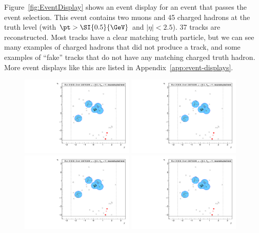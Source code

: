 Figure~\ref{fig:EventDisplay} shows an event display for an event that passes the event selection. This event contains two muons and 45 charged hadrons at the truth level (with $\pt>\SI{0.5}{\GeV}$ and $|\eta|<2.5$). 37 tracks are reconstructed. Most tracks have a clear matching truth particle, but we can see many examples of charged hadrons that did not produce a track, and some examples of ``fake'' tracks that do not have any matching charged truth hadron. More event displays like this are listed in Appendix~\ref{app:event-displays}.

\begin{figure}[h!]
  \centering
  \includegraphics[page=26,width=0.48\textwidth]{figures/EventDisplays.pdf}
  \includegraphics[page=27,width=0.48\textwidth]{figures/EventDisplays.pdf} \\
  \includegraphics[page=29,width=0.48\textwidth]{figures/EventDisplays.pdf}
  \includegraphics[page=30,width=0.48\textwidth]{figures/EventDisplays.pdf}

\end{figure}
